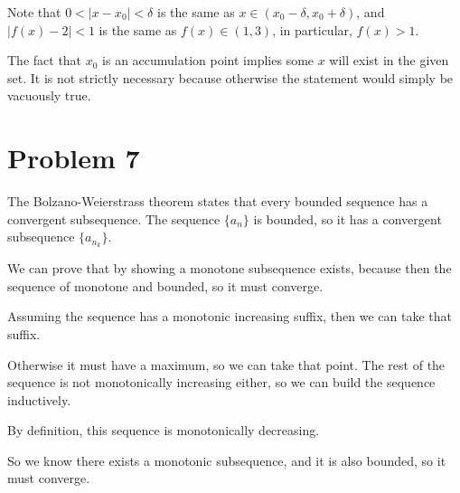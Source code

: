 \documentclass{article}
\begin{document}
Note that $ 0 < | x - x_0| < \delta $ is the same as $ x \in (x_0 - \delta, x_0 + \delta) $, and $ |f(x) - 2| < 1 $ is the same as $ f(x) \in (1, 3) $, in particular, $ f(x) > 1 $.

The fact that $ x_0 $ is an accumulation point implies some $ x $ will exist in the given set. It is not strictly necessary because otherwise the statement would simply be vacuously true.

\section*{Problem 7}
The Bolzano-Weierstrass theorem states that every bounded sequence has a convergent subsequence. The sequence $ \{a_n\} $ is bounded, so it has a convergent subsequence $ \{a_{n_k}\} $.

We can prove that by showing a monotone subsequence exists, because then the sequence of monotone and bounded, so it must converge.

Assuming the sequence has a monotonic increasing suffix, then we can take that suffix.

Otherwise it must have a maximum, so we can take that point. The rest of the sequence is not monotonically increasing either, so we can build the sequence inductively.

By definition, this sequence is monotonically decreasing. 

So we know there exists a monotonic subsequence, and it is also bounded, so it must converge.
\end{document}
